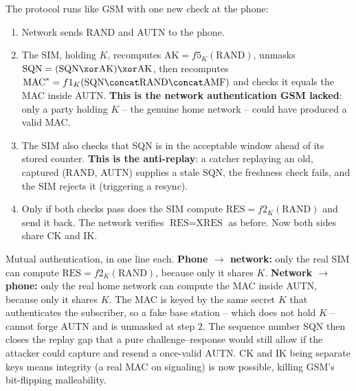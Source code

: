 The protocol runs like GSM with one new check at the phone:

\begin{enumerate}
  \item Network sends RAND and AUTN to the phone.
  \item The SIM, holding $K$, recomputes $\text{AK}=f5_K(\text{RAND})$, unmasks $\text{SQN} = (\text{SQN}\xor\text{AK})\xor\text{AK}$, then recomputes $\text{MAC}^\ast = f1_K(\text{SQN}\concat\text{RAND}\concat\text{AMF})$ and checks it equals the MAC inside AUTN. \textbf{This is the network authentication GSM lacked}: only a party holding $K$ -- the genuine home network -- could have produced a valid MAC.
  \item The SIM also checks that SQN is in the acceptable window ahead of its stored counter. \textbf{This is the anti-replay}: a catcher replaying an old, captured (RAND, AUTN) supplies a stale SQN, the freshness check fails, and the SIM rejects it (triggering a resync).
  \item Only if both checks pass does the SIM compute $\text{RES}=f2_K(\text{RAND})$ and send it back. The network verifies $\text{RES}=\text{XRES}$ as before. Now both sides share CK and IK.
\end{enumerate}

\begin{whybox}
Mutual authentication, in one line each. \textbf{Phone $\to$ network:} only the real SIM can compute $\text{RES}=f2_K(\text{RAND})$, because only it shares $K$. \textbf{Network $\to$ phone:} only the real home network can compute the MAC inside AUTN, because only it shares $K$. The MAC is keyed by the same secret $K$ that authenticates the subscriber, so a fake base station -- which does not hold $K$ -- cannot forge AUTN and is unmasked at step 2. The sequence number SQN then closes the replay gap that a pure challenge--response would still allow if the attacker could capture and resend a once-valid AUTN. CK and IK being separate keys means integrity (a real MAC on signaling) is now possible, killing GSM's bit-flipping malleability.
\end{whybox}

